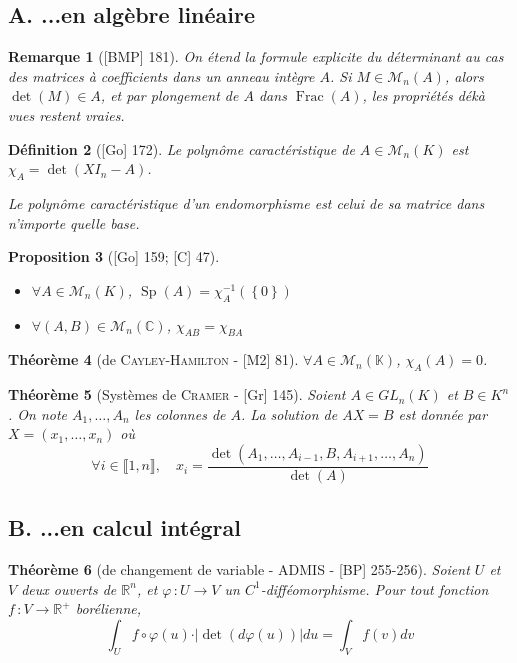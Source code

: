 \documentclass[10pt, a4paper, parskip=full, twoside, twocolumn]{report}
\newtheorem{definition}{Définition}
\newtheorem{theorem}[definition]{Théorème}
\newtheorem{proposition}[definition]{Proposition}
\newtheorem{remark}[definition]{Remarque}
\newcommand{\IK}{\mathbb{K}}
\newcommand{\IC}{\mathbb{C}}
\newcommand{\IR}{\mathbb{R}}
\newcommand{\M}{\mathcal{M}}
\DeclareMathOperator{\Frac}{Frac}
\DeclareMathOperator{\Sp}{Sp}
\begin{document}
\subsection*{A. ...en algèbre linéaire}

\begin{remark}[\textnormal{[BMP] 181}]
	On étend la formule explicite du déterminant au cas des matrices à coefficients dans un anneau intègre $A$.
	Si $M\in \M_n(A)$, alors $\det(M)\in A$, et par plongement de $A$ dans $\Frac(A)$, les propriétés dékà vues restent vraies.
\end{remark}

\begin{definition}[\textnormal{[Go] 172}]
	Le \emph{polynôme caractéristique de $A\in\M_n(K)$} est $\chi_A = \det(XI_n - A)$.

	Le \emph{polynôme caractéristique d'un endomorphisme} est celui de sa matrice dans n'importe quelle base.
\end{definition}

\begin{proposition}[\textnormal{[Go] 159; [C] 47}]
	\begin{itemize}
		\item $\forall A\in\M_n(K)$, $\Sp(A) = \chi^{-1}_A(\left\{0\right\})$
		\item $\forall (A,B)\in\M_n(\IC)$, $\chi_{AB} = \chi_{BA}$
	\end{itemize}
\end{proposition}

\begin{theorem}[de \textsc{Cayley-Hamilton} - \textnormal{[M2] 81}]
	$\forall A\in\M_n(\IK)$, $\chi_A(A)=0$.
\end{theorem}

\begin{theorem}[Systèmes de \textsc{Cramer} - \textnormal{[Gr] 145}]
	Soient $A\in GL_n(K)$ et $B\in K^n$. On note $A_1,\dots, A_n$
	les colonnes de $A$. La solution de $AX=B$ est donnée par $X=(x_1,\dots, x_n)$ où
	$$\forall i\in \llbracket 1,n\rrbracket,\quad x_i = \frac{\det(A_1,\dots,A_{i-1},B,A_{i+1},\dots, A_n)}{\det(A)}$$
\end{theorem}

\subsection*{B. ...en calcul intégral}
\begin{theorem}[de changement de variable - ADMIS - \textnormal{[BP] 255-256}]
	Soient $U$ et $V$ deux ouverts de $\IR^n$, et 
	$\varphi\,\colon U\to V$ un $C^1$-difféomorphisme. Pour tout fonction $f\,\colon V\to \IR^+$ borélienne,
	$$\int_{U} f\circ \varphi(u)\cdot \vert \det(d\varphi(u))\vert du = \int_{V}f(v)dv$$
\end{theorem}
\end{document}
